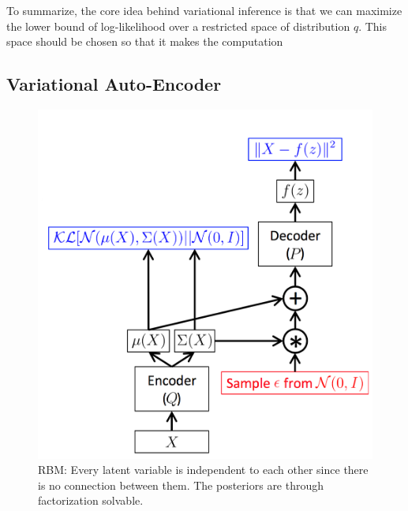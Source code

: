 \documentclass[conference]{IEEEtran}
\begin{document}
To summarize, the core idea behind variational inference is that we can maximize the lower bound of log-likelihood over a restricted space of distribution $q$. This space should be chosen so that it makes the computation 
\subsection{Variational Auto-Encoder}
\begin{figure}[ht]
  \centering
  \includegraphics[scale=0.4]{picture3.png}
     \caption{RBM: Every latent variable is independent to each other since there is no connection between them. The posteriors are through factorization solvable.}\label{pic_3}
\end{figure}
\end{document}

